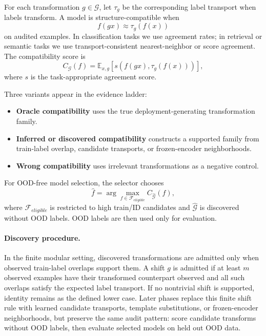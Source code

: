 \documentclass[10pt,twocolumn]{article}
\begin{document}
For each transformation $g \in \mathcal{G}$, let $\tau_g$ be the corresponding
label transport when labels transform. A model is structure-compatible when
\begin{equation}
  f(gx) \approx \tau_g(f(x))
\end{equation}
on audited examples. In classification tasks we use agreement rates; in
retrieval or semantic tasks we use transport-consistent nearest-neighbor or
score agreement. The compatibility score is
\begin{equation}
  C_{\mathcal{G}}(f) =
  \mathbb{E}_{x,g}\left[s\left(f(gx), \tau_g(f(x))\right)\right],
\end{equation}
where $s$ is the task-appropriate agreement score.

Three variants appear in the evidence ladder:
\begin{itemize}
  \item \textbf{Oracle compatibility} uses the true deployment-generating
  transformation family.
  \item \textbf{Inferred or discovered compatibility} constructs a supported
  family from train-label overlap, candidate transports, or frozen-encoder
  neighborhoods.
  \item \textbf{Wrong compatibility} uses irrelevant transformations as a
  negative control.
\end{itemize}

For OOD-free model selection, the selector chooses
\begin{equation}
  \hat{f} = \arg\max_{f \in \mathcal{F}_{eligible}} C_{\hat{\mathcal{G}}}(f),
\end{equation}
where $\mathcal{F}_{eligible}$ is restricted to high train/ID candidates and
$\hat{\mathcal{G}}$ is discovered without OOD labels. OOD labels are then used
only for evaluation.

\paragraph{Discovery procedure.}
In the finite modular setting, discovered transformations are admitted only when
observed train-label overlaps support them. A shift $g$ is admitted if at least
$m$ observed examples have their transformed counterpart observed and all such
overlaps satisfy the expected label transport. If no nontrivial shift is
supported, identity remains as the defined lower case. Later phases replace this
finite shift rule with learned candidate transports, template substitutions, or
frozen-encoder neighborhoods, but preserve the same audit pattern: score
candidate transforms without OOD labels, then evaluate selected models on held
out OOD data.
\end{document}
